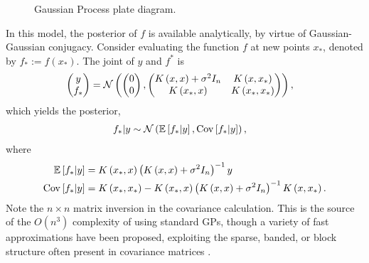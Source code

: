 \begin{figure}
  \centering

  \caption{Gaussian Process plate diagram.\label{fig:gp_plate} }
\end{figure}


In this model, the posterior of $f$ is available analytically, by virtue of
Gaussian-Gaussian conjugacy. Consider evaluating the function $f$ at new points
$x_{\ast}$, denoted by $f_{\ast} := f\left(x_{\ast}\right)$. The joint of $y$
and $f^{\ast}$ is
\begin{align*}
  \begin{pmatrix}
    y \\ f_{\ast}
  \end{pmatrix} &= \mathcal{N}\left(
 \begin{pmatrix}
   0 \\ 0
 \end{pmatrix} ,
\begin{pmatrix}
  K\left(x, x\right) + \sigma^{2}I_{n} & K\left(x, x_{\ast}\right) \\
  K\left(x_{\ast}, x\right) & K\left(x_{\ast}, x_{\ast}\right)
\end{pmatrix}
  \right),
\end{align*}
which yields the posterior,
\begin{align*}
  f_{\ast} \vert y &\sim \mathcal{N}\left(\mathbb{E}\left[{f_{\ast} \vert y}\right], \mathrm{Cov}\left[{f_{\ast} \vert y}\right]\right),
\end{align*}
where
\begin{align*}
  \mathbb{E}\left[{f_{\ast} \vert y}\right] &= K\left(x_{\ast}, x\right)\left(K\left(x, x\right) + \sigma^{2}I_{n}\right)^{-1}y \\
  \mathrm{Cov}\left[{f_{\ast} \vert y}\right] &= K\left(x_{\ast}, x_{\ast}\right) - K\left(x_{\ast}, x\right)\left(K\left(x, x\right) + \sigma^{2}I_{n}\right)^{-1}K\left(x, x_{\ast}\right).
\end{align*}
Note the $n\times n$ matrix inversion in the covariance calculation. This is the
source of the $O\left(n^{3}\right)$ complexity of using standard GPs, though a
variety of fast approximations have been proposed, exploiting the sparse,
banded, or block structure often present in covariance matrices
\citep{quinonero2007approximation}.

